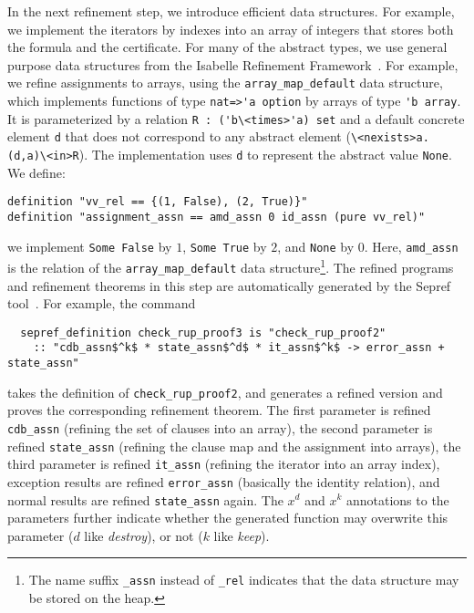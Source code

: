 \documentclass{llncs}
\newcommand{\isai}{\lstinline[language=isabelle,basicstyle=\normalsize\ttfamily\slshape]}
\begin{document}
In the next refinement step, we introduce efficient data structures. For example, we implement the iterators by indexes 
into an array of integers that stores both the formula and the certificate.
For many of the abstract types, we use general purpose data structures from the Isabelle Refinement Framework~\cite{La15,La16}.
For example, we refine assignments to arrays, using the \isai{array_map_default} data structure, which implements functions of type \isai{nat=>'a option} by
arrays of type \isai$'b array$. It is parameterized by a relation \isai$R : ('b\<times>'a) set$ and a default concrete element \isai$d$ that does not correspond to 
any abstract element (\isai$\<nexists>a. (d,a)\<in>R$). The implementation uses \isai$d$ to represent the abstract value \isai$None$.
We define:
\begin{lstlisting}
definition "vv_rel == {(1, False), (2, True)}"
definition "assignment_assn == amd_assn 0 id_assn (pure vv_rel)"
\end{lstlisting}
\ie we implement \isai{Some False} by $1$, \isai{Some True} by $2$, and \isai$None$ by $0$.
Here, \isai$amd_assn$ is the relation of the \isai$array_map_default$ data structure\footnote{The name suffix \isai$_assn$ instead of \isai$_rel$ 
indicates that the data structure may be stored on the heap.}.
The refined programs and refinement theorems in this step are automatically generated by the Sepref tool~\cite{La15}. For example, the command
\begin{lstlisting}
  sepref_definition check_rup_proof3 is "check_rup_proof2"
    :: "cdb_assn$^k$ * state_assn$^d$ * it_assn$^k$ -> error_assn + state_assn"
\end{lstlisting}
takes the definition of \isai{check_rup_proof2}, and generates a refined version and proves the corresponding refinement theorem.
The first parameter is refined \wrt \isai{cdb_assn} (refining the set of clauses into an array), 
the second parameter is refined \wrt \isai{state_assn} (refining the clause map and the assignment into arrays), the third parameter is refined 
\wrt \isai{it_assn} (refining the iterator into an array index), exception results are 
refined \wrt \isai{error_assn} (basically the identity relation), and normal results are refined \wrt \isai{state_assn} again.
The $x^d$ and $x^k$ annotations to the parameters further indicate whether the generated function may overwrite this parameter ($d$ like {\em destroy}),
or not ($k$ like {\em keep}). 
\end{document}
